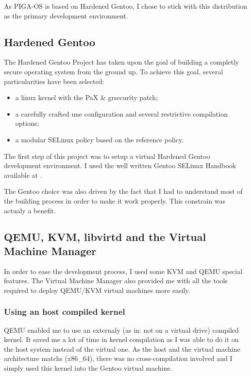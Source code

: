 \documentclass[pdftex,a4paper,titlepage,11pt]{article}
\begin{document}
\smallskip

As PIGA-OS is based on Hardened Gentoo, I chose to stick with this distribution
as the primary development environment.

\subsection{Hardened Gentoo}

The Hardened Gentoo Project has taken upon the goal of building a completly
secure operating system from the ground up. To achieve this goal, several
particularities have been selected:
\begin{itemize}
	\item a linux kernel with the PaX \& grsecurity patch;
	\item a carefully crafted une configuration and several restrictive
compilation options;
	\item a modular SELinux policy based on the reference policy.
\end{itemize}

\smallskip

The first step of this project was to setup a virtual Hardened Gentoo
development environment. I used the well written Gentoo SELinux Handbook
available at \cite{gentooselinuxhandbook}.

\bigskip

The Gentoo choice was also driven by the fact that I had to understand most of
the building process in order to make it work properly. This constrain was
actualy a benefit.

\subsection{QEMU, KVM, libvirtd and the Virtual Machine Manager}

In order to ease the development process, I used some KVM and QEMU special
features. The Virtual Machine Manager also provided me with all the tools
required to deploy QEMU/KVM virtual machines more easily.

\subsubsection{Using an host compiled kernel}

QEMU enabled me to use an externaly (as in: not on a virtual drive) compiled
kernel. It saved me a lot of time in kernel compilation as I was able to do it
on the host system instead of the virtual one. As the host and the virtual
machine architecture matchs (x86\_64), there was no cross-compilation involved
and I simply used this kernel into the Gentoo virtual machine.
\end{document}
